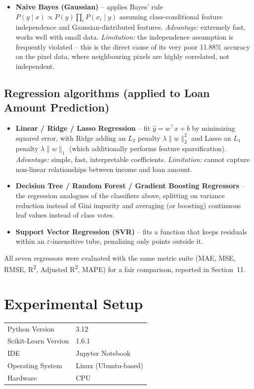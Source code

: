 \documentclass[12pt,a4paper]{article}
\begin{document}
\begin{itemize}
\item \textbf{Naive Bayes (Gaussian)} -- applies Bayes' rule $P(y\mid x)\propto P(y)\prod_i P(x_i\mid y)$ assuming class-conditional feature independence and Gaussian-distributed features. \textit{Advantage:} extremely fast, works well with small data. \textit{Limitation:} the independence assumption is frequently violated -- this is the direct cause of its very poor 11.88\% accuracy on the pixel data, where neighbouring pixels are highly correlated, not independent.
\end{itemize}
 
\subsection{Regression algorithms (applied to Loan Amount Prediction)}
\begin{itemize}
\item \textbf{Linear / Ridge / Lasso Regression} -- fit $\hat y = w^\top x + b$ by minimizing squared error, with Ridge adding an $L_2$ penalty $\lambda\lVert w\rVert_2^2$ and Lasso an $L_1$ penalty $\lambda\lVert w\rVert_1$ (which additionally performs feature sparsification). \textit{Advantage:} simple, fast, interpretable coefficients. \textit{Limitation:} cannot capture non-linear relationships between income and loan amount.
\item \textbf{Decision Tree / Random Forest / Gradient Boosting Regressors} -- the regression analogues of the classifiers above, splitting on variance reduction instead of Gini impurity and averaging (or boosting) continuous leaf values instead of class votes.
\item \textbf{Support Vector Regression (SVR)} -- fits a function that keeps residuals within an $\varepsilon$-insensitive tube, penalizing only points outside it.
\end{itemize}
All seven regressors were evaluated with the same metric suite (MAE, MSE, RMSE, R\textsuperscript{2}, Adjusted R\textsuperscript{2}, MAPE) for a fair comparison, reported in Section~11.
 
\section{Experimental Setup}
\begin{tabular}{ll}
\toprule
Python Version & 3.12 \\
Scikit-Learn Version & 1.6.1 \\
IDE & Jupyter Notebook \\
Operating System & Linux (Ubuntu-based) \\
Hardware & CPU \\
\bottomrule
\end{tabular}
 
\end{document}
